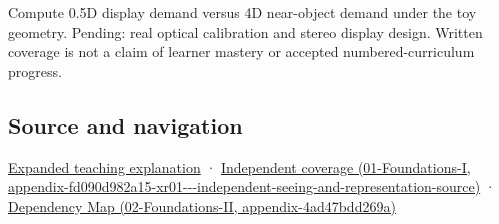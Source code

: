 Compute 0.5D display demand versus 4D near-object demand under the toy geometry. Pending: real optical calibration and stereo display design. Written coverage is not a claim of learner mastery or accepted numbered-curriculum progress.

\subsection{Source and navigation}\label{appendix-f90cee1be7a4-source-and-navigation}

\hyperref[04-visual-computing-ii-ch042-focus-and-stereo-can-disagree-even-when-the-images-are-sharp]{Expanded teaching explanation} · \href{../01-Foundations-I/main.pdf\#nameddest=appendix-fd090d982a15-xr01---independent-seeing-and-representation-source}{Independent coverage (01-Foundations-I, appendix-fd090d982a15-xr01-\/-\/-independent-seeing-and-representation-source)} · \href{../02-Foundations-II/main.pdf\#nameddest=appendix-4ad47bdd269a}{Dependency Map (02-Foundations-II, appendix-4ad47bdd269a)}

